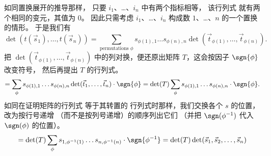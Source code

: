 \begin{exercises}
\begin{answer}
      如同置换展开的推导那样，
      只要 $i_1$、\ldots、$i_n$ 中有两个指标相等，
      该行列式
      就有两个相同的变元，其值为 $0$。
      因此只需考虑 $i_1$、\ldots、$i_n$ 构成数
      $1$、\ldots、$n$ 的一个置换的情形。
      于是我们有
      \begin{equation*}
        \det(t(\vec{s}_1),\dots,t(\vec{s}_n))=
          \sum_{\text{permutations\ } \phi}
            s_{\phi(1),1}\dots s_{\phi(n),n}
            \det(\vec{t}_{\phi(1)},\dots,\vec{t}_{\phi(n)}).
      \end{equation*}
      把 $\det(\vec{t}_{\phi(1)},\ldots,\vec{t}_{\phi(n)})$
      中的列对换，便还原出矩阵 \( T \)，这会按因子
      $\sgn{\phi}$ 改变符号，
      然后再提出 $T$ 的行列式。
      \begin{equation*}
        =\sum_\phi
          s_{\phi(1),1}\dots s_{\phi(n),n}
            \det(\vec{t}_1,\dots,\vec{t}_n)\cdot\sgn{\phi}
        =\det(T)\sum_\phi
          s_{\phi(1),1}\dots s_{\phi(n),n}\cdot\sgn{\phi}.
      \end{equation*}
      如同在证明矩阵的行列式
      等于其转置的
      行列式时那样，我们交换各个 $s$ 的位置，改为按行号递增
      （而不是按列号递增）的顺序列出它们
      （并把 $\sgn(\phi^{-1})$ 代入 $\sgn(\phi)$ 的位置）。
      \begin{equation*}
        =\det(T)\sum_\phi
          s_{1,\phi^{-1}(1)}\dots s_{n,\phi^{-1}(n)}\cdot\sgn{\phi^{-1}}  
        =\det(T)\det(\vec{s}_1,\vec{s}_2,\dots,\vec{s}_n)
      \end{equation*}
    \end{answer}

\end{exercises}
